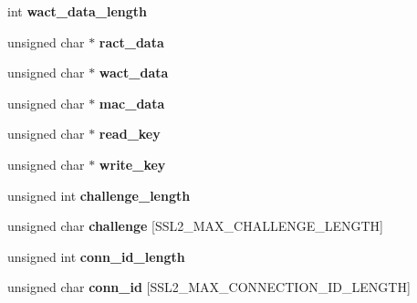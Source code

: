 \begin{DoxyCompactItemize}
\item 
\hypertarget{structssl2__state__st_a711f0a57b4cbdead8338290b26091c40}{}int {\bfseries wact\+\_\+data\+\_\+length}\label{structssl2__state__st_a711f0a57b4cbdead8338290b26091c40}

\item 
\hypertarget{structssl2__state__st_aefb909a1012efb647000b6f1604a2eb7}{}unsigned char $\ast$ {\bfseries ract\+\_\+data}\label{structssl2__state__st_aefb909a1012efb647000b6f1604a2eb7}

\item 
\hypertarget{structssl2__state__st_a356c1be4239c904d8ae8029d00c67f9c}{}unsigned char $\ast$ {\bfseries wact\+\_\+data}\label{structssl2__state__st_a356c1be4239c904d8ae8029d00c67f9c}

\item 
\hypertarget{structssl2__state__st_a9416e79c8eea6411034877fb17d2753e}{}unsigned char $\ast$ {\bfseries mac\+\_\+data}\label{structssl2__state__st_a9416e79c8eea6411034877fb17d2753e}

\item 
\hypertarget{structssl2__state__st_aeee9913d4be0f5c9ceb2cecf2138fed0}{}unsigned char $\ast$ {\bfseries read\+\_\+key}\label{structssl2__state__st_aeee9913d4be0f5c9ceb2cecf2138fed0}

\item 
\hypertarget{structssl2__state__st_aa4740a68be06f6fe8b469869a3080dda}{}unsigned char $\ast$ {\bfseries write\+\_\+key}\label{structssl2__state__st_aa4740a68be06f6fe8b469869a3080dda}

\item 
\hypertarget{structssl2__state__st_a7f563915cbb84b32c5f96cb7e4838998}{}unsigned int {\bfseries challenge\+\_\+length}\label{structssl2__state__st_a7f563915cbb84b32c5f96cb7e4838998}

\item 
\hypertarget{structssl2__state__st_aceaded62c7097ab2f7b6f3c2c0650d03}{}unsigned char {\bfseries challenge} \mbox{[}S\+S\+L2\+\_\+\+M\+A\+X\+\_\+\+C\+H\+A\+L\+L\+E\+N\+G\+E\+\_\+\+L\+E\+N\+G\+T\+H\mbox{]}\label{structssl2__state__st_aceaded62c7097ab2f7b6f3c2c0650d03}

\item 
\hypertarget{structssl2__state__st_a802704a6566f2d30dcba9c39b00b98b6}{}unsigned int {\bfseries conn\+\_\+id\+\_\+length}\label{structssl2__state__st_a802704a6566f2d30dcba9c39b00b98b6}

\item 
\hypertarget{structssl2__state__st_ae3f7008cf3a56bdb8555e91cf4c0b9d0}{}unsigned char {\bfseries conn\+\_\+id} \mbox{[}S\+S\+L2\+\_\+\+M\+A\+X\+\_\+\+C\+O\+N\+N\+E\+C\+T\+I\+O\+N\+\_\+\+I\+D\+\_\+\+L\+E\+N\+G\+T\+H\mbox{]}\label{structssl2__state__st_ae3f7008cf3a56bdb8555e91cf4c0b9d0}


\end{DoxyCompactItemize}
